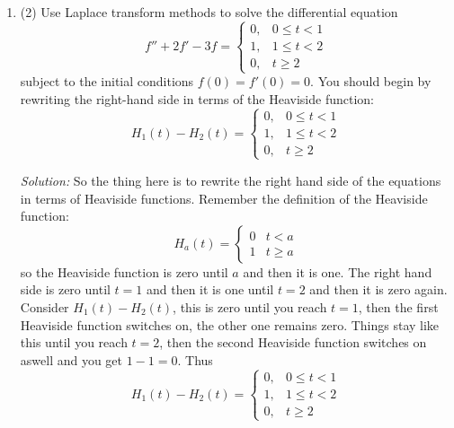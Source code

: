 \documentclass[12pt]{article}
\newcommand{\soln}{\noindent\textit{Solution:}}
\begin{document}
\begin{enumerate}
\item (2) Use Laplace transform methods to solve the differential equation
\begin{equation}
f'' + 2 f' - 3 f =
\left\{ \begin{array}{ll}
0, & 0 \le t < 1\\
1, & 1\le t < 2\\
0, & t\ge 2
\end{array}\right.
\end{equation}
subject to the initial conditions $f(0) =f'(0) = 0$. You should begin by rewriting the right-hand side in terms of the Heaviside function:
\begin{equation}
H_1(t)-H_2(t)=
\left\{ \begin{array}{ll}
0, & 0 \le t < 1\\
1, & 1\le t < 2\\
0, & t\ge 2
\end{array}\right.
\end{equation}

\soln
So the thing here is to rewrite the right hand side of the equations in terms of Heaviside functions. Remember the definition of the Heaviside function:
\begin{equation}
H_a(t)=\left\{\begin{array}{ll}0&t<a\\1&t\ge a\end{array}\right.
\end{equation}
so the Heaviside function is zero until $a$ and then it is one. The
right hand side is zero until $t=1$ and then it is one until $t=2$ and
then it is zero again. Consider $H_1(t)-H_2(t)$, this is zero until
you reach $t=1$, then the first Heaviside function switches on, the
other one remains zero. Things stay like this until you reach $t=2$, then the second Heaviside function switches on aswell and you get $1-1=0$. Thus
\begin{equation}
H_1(t)-H_2(t)=\left\{ \begin{array}{ll}
0, & 0 \le t < 1\\
1, & 1\le t < 2\\
0, & t\ge 2
\end{array}\right.
\end{equation}


\end{enumerate}
\end{document}
